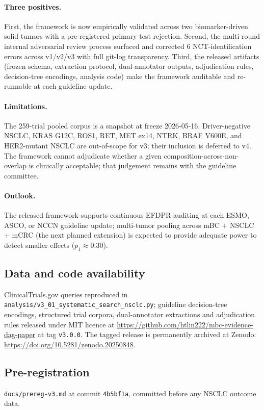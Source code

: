 \documentclass[11pt,a4paper]{article}
\begin{document}
\paragraph{Three positives.}
First, the framework is now empirically validated across two biomarker-driven solid tumors with a pre-registered primary test rejection. Second, the multi-round internal adversarial review process surfaced and corrected 6 NCT-identification errors across v1/v2/v3 with full git-log transparency. Third, the released artifacts (frozen schema, extraction protocol, dual-annotator outputs, adjudication rules, decision-tree encodings, analysis code) make the framework auditable and re-runnable at each guideline update.

\paragraph{Limitations.}
The 259-trial pooled corpus is a snapshot at freeze 2026-05-16. Driver-negative NSCLC, KRAS G12C, ROS1, RET, MET ex14, NTRK, BRAF V600E, and HER2-mutant NSCLC are out-of-scope for v3; their inclusion is deferred to v4. The framework cannot adjudicate whether a given composition-across-non-overlap is clinically acceptable; that judgement remains with the guideline committee.

\paragraph{Outlook.}
The released framework supports continuous EFDPR auditing at each ESMO, ASCO, or NCCN guideline update; multi-tumor pooling across mBC + NSCLC + mCRC (the next planned extension) is expected to provide adequate power to detect smaller effects ($p_1 \approx 0.30$).

\subsection*{Data and code availability}
ClinicalTrials.gov queries reproduced in \texttt{analysis/v3\_01\_systematic\_search\_nsclc.py}; guideline decision-tree encodings, structured trial corpora, dual-annotator extractions and adjudication rules released under MIT licence at \url{https://github.com/htlin222/mbc-evidence-dag-paper} at tag \texttt{v3.0.0}. The tagged release is permanently archived at Zenodo: \url{https://doi.org/10.5281/zenodo.20250848}.

\subsection*{Pre-registration}
\texttt{docs/prereg-v3.md} at commit \texttt{4b5bf1a}, committed before any NSCLC outcome data.
\end{document}
